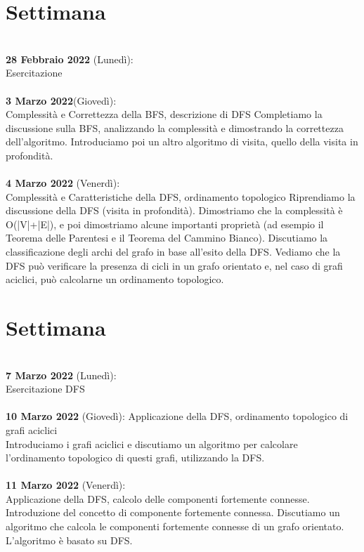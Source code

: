 \documentclass{article}
\begin{document}
\section{Settimana}
\\\textbf{28 Febbraio 2022} (Lunedì): \\Esercitazione\\
\\\textbf{3 Marzo 2022}(Giovedì): \\Complessità e Correttezza della BFS, descrizione di DFS
Completiamo la discussione sulla BFS, analizzando la complessità e dimostrando la correttezza dell'algoritmo. Introduciamo poi un altro algoritmo di visita, quello della visita in profondità.\\
\\\textbf{4 Marzo 2022} (Venerdì): \\Complessità e Caratteristiche della DFS, ordinamento topologico
Riprendiamo la discussione della DFS (visita in profondità). Dimostriamo che la complessità è O(|V|+|E|), e poi dimostriamo alcune importanti proprietà (ad esempio il Teorema delle Parentesi e il Teorema del Cammino Bianco). Discutiamo la classificazione degli archi del grafo in base all'esito della DFS. Vediamo che la DFS può verificare la presenza di cicli in un grafo orientato e, nel caso di grafi aciclici, può calcolarne un ordinamento topologico.

\section{Settimana}
\\\textbf{7 Marzo 2022} (Lunedì): \\Esercitazione DFS\\
\\\textbf{10 Marzo 2022} (Giovedì): Applicazione della DFS, ordinamento topologico di grafi aciclici\\
Introduciamo i grafi aciclici e discutiamo un algoritmo per calcolare l'ordinamento topologico di questi grafi, utilizzando la DFS.\\
\\\textbf{11 Marzo 2022} (Venerdì): \\Applicazione della DFS, calcolo delle componenti fortemente connesse.
\\Introduzione del concetto di componente fortemente connessa. Discutiamo un algoritmo che calcola le componenti fortemente connesse di un grafo orientato. L'algoritmo è basato su DFS.
\end{document}
